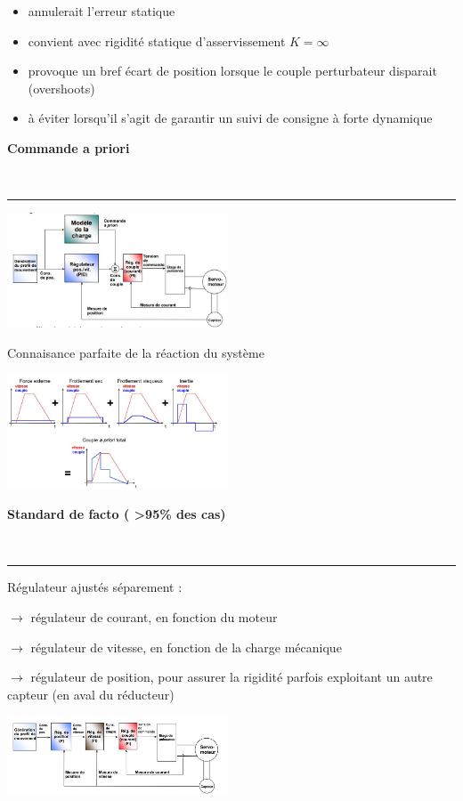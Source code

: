 \documentclass[	DIV=calc,%
							paper=a4,%
							fontsize=10pt,%
							twocolumn]{scrartcl} %
\newcounter{mycounter}
\newcommand{\formdesc}[1]{\large\textbf{#1} \addtocounter{mycounter}{1} \hfill \themycounter \\ \vspace{-3mm} \hrule \vspace{2mm}}
\begin{document}
\begin{itemize}
    \item annulerait l’erreur statique
    \item convient avec rigidité statique d'asservissement $ K = \infty $
    \item provoque un bref écart de position lorsque le couple perturbateur disparait (overshoots)
    \item à éviter lorsqu'il s'agit de garantir un suivi de consigne à forte dynamique
\end{itemize}


\formdesc{Commande a priori}

\includegraphics[width=0.49\textwidth]{img/com_apriorie.JPG}

Connaisance parfaite de la réaction du système 

\includegraphics[width=0.49\textwidth]{img/com_apriorie_2.JPG}

\newpage

\formdesc{Standard de facto ( >95\% des cas)}

Régulateur ajustés séparement :

$\rightarrow $ régulateur de courant, en fonction du moteur

$\rightarrow $ régulateur de vitesse, en fonction de la charge mécanique

$\rightarrow $ régulateur de position, pour assurer la rigidité parfois exploitant un autre capteur (en aval du réducteur)

\includegraphics[width=0.49\textwidth]{img/stad_facto.JPG}
\end{document}
